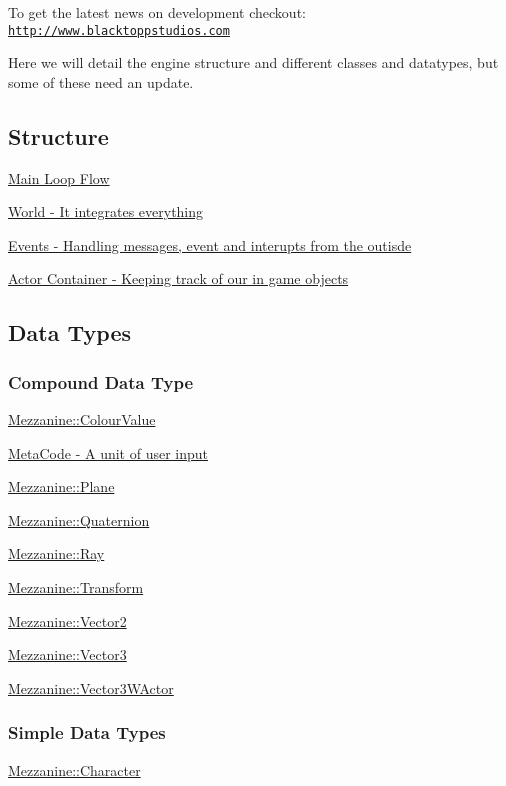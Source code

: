 To get the latest news on development checkout: \href{http://www.blacktoppstudios.com}{\tt http://www.blacktoppstudios.com}

Here we will detail the engine structure and different classes and datatypes, but some of these need an update.\hypertarget{index_Engine}{}\subsection{Structure}\label{index_Engine}
\hyperlink{mainloop1}{Main Loop Flow}

\hyperlink{classMezzanine_1_1World}{World -\/ It integrates everything}

\hyperlink{classMezzanine_1_1EventManager}{Events -\/ Handling messages, event and interupts from the outisde}

\hyperlink{actorcontainer1}{Actor Container -\/ Keeping track of our in game objects}\hypertarget{index_Types}{}\subsection{Data Types}\label{index_Types}
\hypertarget{index_CompoundTypes}{}\subsubsection{Compound Data Type}\label{index_CompoundTypes}
\hyperlink{classMezzanine_1_1ColourValue}{Mezzanine::ColourValue}

\hyperlink{classMezzanine_1_1MetaCode}{MetaCode -\/ A unit of user input}

\hyperlink{classMezzanine_1_1Plane}{Mezzanine::Plane}

\hyperlink{classMezzanine_1_1Quaternion}{Mezzanine::Quaternion}

\hyperlink{classMezzanine_1_1Ray}{Mezzanine::Ray}

\hyperlink{classMezzanine_1_1Transform}{Mezzanine::Transform}

\hyperlink{classMezzanine_1_1Vector2}{Mezzanine::Vector2}

\hyperlink{classMezzanine_1_1Vector3}{Mezzanine::Vector3}

\hyperlink{classMezzanine_1_1Vector3WActor}{Mezzanine::Vector3WActor}\hypertarget{index_SimpleDataTypes}{}\subsubsection{Simple Data Types}\label{index_SimpleDataTypes}
\hyperlink{namespaceMezzanine_ad5147a419db7627ee552a2b582f1052d}{Mezzanine::Character}

